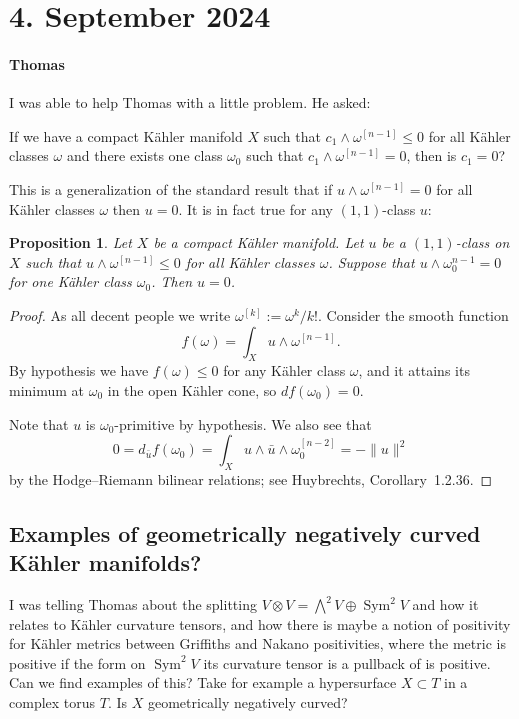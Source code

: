 \documentclass[11pt]{amsart}
\newtheorem{prop}[theo]{Proposition}
\theoremstyle{definition}
\def\^#1{^{[#1]}}
\DeclareMathOperator{\Sym}{Sym}
\begin{document}
\section{4. September 2024}

\paragraph{Thomas}

I was able to help Thomas with a little problem.
He asked:

If we have a compact K\"ahler manifold $X$ such that $c_1 \wedge \omega\^{n-1} \leq 0$ for all K\"ahler classes $\omega$ and there exists one class $\omega_0$ such that $c_1 \wedge \omega\^{n-1} = 0$, then is $c_1 = 0$?

This is a generalization of the standard result that if $u \wedge \omega\^{n-1} = 0$ for all K\"ahler classes $\omega$ then $u = 0$.
It is in fact true for any $(1,1)$-class $u$:


\begin{prop}
Let $X$ be a compact K\"ahler manifold.
Let $u$ be a $(1,1)$-class on $X$ such that $u \wedge \omega\^{n-1} \leq 0$ for all K\"ahler classes $\omega$.
Suppose that $u \wedge \omega_0^{n-1} = 0$ for one K\"ahler class $\omega_0$.
Then $u = 0$.
\end{prop}

\begin{proof}
As all decent people we write $\omega\^{k} := \omega^k / k!$.
Consider the smooth function
\[
f(\omega) = \int_X u \wedge \omega\^{n-1}.
\]
By hypothesis we have $f(\omega) \leq 0$ for any K\"ahler class $\omega$, and it attains its minimum at $\omega_0$ in the open K\"ahler cone, so $d f(\omega_0) = 0$.

Note that $u$ is $\omega_0$-primitive by hypothesis.
We also see that
\[
0 = d_{\bar u} f(\omega_0) 
= \int_X u \wedge \bar u \wedge \omega_0\^{n-2}
= - \|u\|^2
\]
by the Hodge--Riemann bilinear relations; see Huybrechts, Corollary~1.2.36.
\end{proof}

\subsection*{Examples of geometrically negatively curved K\"ahler manifolds?}

I was telling Thomas about the splitting $V \otimes V = \bigwedge^2 V \oplus \Sym^2 V$ and how it relates to K\"ahler curvature tensors, and how there is maybe a notion of positivity for K\"ahler metrics between Griffiths and Nakano positivities, where the metric is positive if the form on $\Sym^2 V$ its curvature tensor is a pullback of is positive.
Can we find examples of this?
Take for example a hypersurface $X \subset T$ in a complex torus $T$.
Is $X$ geometrically negatively curved?
\end{document}
